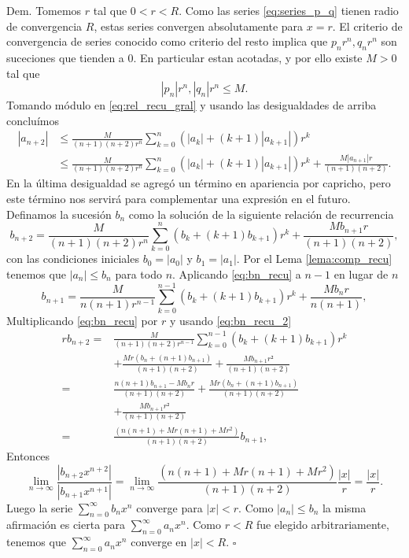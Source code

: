 \documentclass{article}
\newenvironment{demo}{\noindent\emph{Dem.}}{{\hspace*{\fill}$\square$} \newline\vspace{5pt}}
\newcounter{lem_cont}
\renewcommand{\emph}[1]{\textcolor[rgb]{0,0,1}{#1}}
\begin{document}
\begin{demo}
Tomemos $r$ tal que $0<r<R$. Como las series \eqref{eq:series_p_q} tienen radio de convergencia $R$, estas series convergen absolutamente para $x=r$. El criterio de convergencia de series conocido como criterio del resto implica que $p_nr^n,q_nr^n$ son suceciones que tienden a $0$. En particular estan acotadas, y por ello existe $M>0$ tal que
\[ |p_n|r^n,|q_n|r^n\leq M.\]
Tomando módulo en \eqref{eq:rel_recu_gral} y usando las desigualdades de arriba concluímos
\[
  \begin{split}
    |a_{n+2}|&\leq\frac{M}{(n+1)(n+2)r^n} \sum_{k=0}^n\left(|a_k|+ (k+1)|a_{k+1}|\right)r^k\\
&\leq\frac{M}{(n+1)(n+2)r^n} \sum_{k=0}^n\left(|a_k|+ (k+1)|a_{k+1}|\right)r^k+\frac{M|a_{n+1}|r}{(n+1)(n+2)}.
  \end{split}
  \]
En la última desigualdad se agregó un término en apariencia por capricho, pero este término nos servirá para complementar una expresión en el futuro. Definamos la sucesión $b_n$ como la solución de la siguiente relación de recurrencia
\begin{equation}\label{eq:bn_recu}b_{n+2}=\frac{M}{(n+1)(n+2)r^n} \sum_{k=0}^n\left(b_k+ (k+1)b_{k+1}\right)r^k+\frac{Mb_{n+1}r}{(n+1)(n+2)},
\end{equation}
con las condiciones iniciales $b_0=|a_0|$ y $b_1=|a_1|$. Por el Lema \ref{lema:comp_recu} tenemos que $|a_n|\leq b_n$ para todo $n$. Aplicando \eqref{eq:bn_recu} a $n-1$ en lugar de $n$
\begin{equation}\label{eq:bn_recu_2}b_{n+1}=\frac{M}{n(n+1)r^{n-1}} \sum_{k=0}^{n-1}\left(b_k+ (k+1)b_{k+1}\right)r^k+\frac{Mb_{n}r}{n(n+1)},
\end{equation}
Multiplicando  \eqref{eq:bn_recu} por $r$ y usando \ref{eq:bn_recu_2}
\[
\begin{split}
rb_{n+2}=&\frac{M}{(n+1)(n+2)r^{n-1}} \sum_{k=0}^{n-1}\left(b_k+ (k+1)b_{k+1}\right)r^k\\
&+\frac{Mr\left(b_n+ (n+1)b_{n+1}\right)}{(n+1)(n+2)}+\frac{Mb_{n+1}r²}{(n+1)(n+2)}\\
=&\frac{n(n+1)b_{n+1}-Mb_nr}{(n+1)(n+2)}
+\frac{Mr\left(b_n+ (n+1)b_{n+1}\right)}{(n+1)(n+2)}\\
&+\frac{Mb_{n+1}r²}{(n+1)(n+2)}\\
=&\frac{(n(n+1)+Mr(n+1)+Mr^2)}{(n+1)(n+2)}b_{n+1},
\end{split}
\]
Entonces 
\[\lim_{n\to\infty}\frac{|b_{n+2}x^{n+2}|}{|b_{n+1}x^{n+1}|}=\lim_{n\to\infty}\frac{(n(n+1)+Mr(n+1)+Mr^2)}{(n+1)(n+2)}\frac{|x|}{r}=\frac{|x|}{r}.
\]
Luego la serie $\sum_{n=0}^{\infty}b_nx^n$ converge para $|x|<r$. Como $|a_n|\leq b_n$ la misma afirmación es cierta para $\sum_{n=0}^{\infty}a_nx^n$. Como $r<R$ fue elegido arbitrariamente, tenemos que $\sum_{n=0}^{\infty}a_nx^n$ converge en $|x|<R$.
\end{demo}
\end{document}
